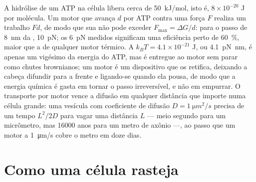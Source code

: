 \begin{proposition}\label{prop:b3:cytoskeleton-motility:physics}
A hidrólise de um ATP na célula libera cerca de \qty{50}{kJ/mol}, isto
é, $8\times 10^{-20}$ J por molécula. Um motor que avança $d$ por ATP
contra uma força $F$ realiza um trabalho $Fd$, de modo que sua
\emph{} não pode exceder $F_{\max} = \Delta G/d$: para o
passo de \qty{8}{nm} da , \qty{10}{pN}; os \qty{6}{pN} medidos
significam uma eficiência perto de \qty{60}{\%}, maior que a de
qualquer motor térmico. A  $k_{B}T =
4.1\times 10^{-21}$ J, ou \qty{4.1}{pN.nm}, é apenas um vigésimo da
energia do ATP, mas é entregue ao motor sem parar como chutes
brownianos; um motor é um dispositivo que os retifica, deixando a
cabeça difundir para a frente e ligando-se quando ela pousa, de modo
que a energia química é gasta em tornar o passo irreversível, e não em
empurrar. O transporte por motor vence a difusão em qualquer distância
que importe numa célula grande: uma vesícula com coeficiente de difusão
$D = \qty{1}{\micro
m^2/s}$ precisa de um tempo $L^{2}/2D$ para
vagar uma distância $L$ --- meio segundo para um micrômetro, mas
\num{16000} anos para um metro de axônio ---, ao passo que um motor a
\qty{1}{\micro m/s} cobre o metro em doze dias.
\end{proposition}
\admitted

\section{Como uma célula rasteja}

